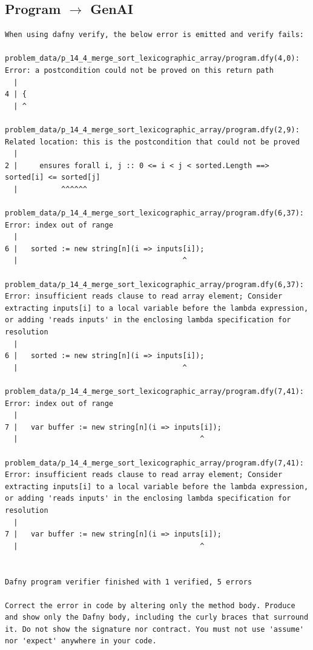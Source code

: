 \documentclass{article}
\begin{document}
\subsection*{Program $\rightarrow$ GenAI}
\begin{lstlisting}
When using dafny verify, the below error is emitted and verify fails:

problem_data/p_14_4_merge_sort_lexicographic_array/program.dfy(4,0): Error: a postcondition could not be proved on this return path
  |
4 | {
  | ^

problem_data/p_14_4_merge_sort_lexicographic_array/program.dfy(2,9): Related location: this is the postcondition that could not be proved
  |
2 | 	ensures forall i, j :: 0 <= i < j < sorted.Length ==> sorted[i] <= sorted[j]
  |          ^^^^^^

problem_data/p_14_4_merge_sort_lexicographic_array/program.dfy(6,37): Error: index out of range
  |
6 |   sorted := new string[n](i => inputs[i]);
  |                                      ^

problem_data/p_14_4_merge_sort_lexicographic_array/program.dfy(6,37): Error: insufficient reads clause to read array element; Consider extracting inputs[i] to a local variable before the lambda expression, or adding 'reads inputs' in the enclosing lambda specification for resolution
  |
6 |   sorted := new string[n](i => inputs[i]);
  |                                      ^

problem_data/p_14_4_merge_sort_lexicographic_array/program.dfy(7,41): Error: index out of range
  |
7 |   var buffer := new string[n](i => inputs[i]);
  |                                          ^

problem_data/p_14_4_merge_sort_lexicographic_array/program.dfy(7,41): Error: insufficient reads clause to read array element; Consider extracting inputs[i] to a local variable before the lambda expression, or adding 'reads inputs' in the enclosing lambda specification for resolution
  |
7 |   var buffer := new string[n](i => inputs[i]);
  |                                          ^


Dafny program verifier finished with 1 verified, 5 errors

Correct the error in code by altering only the method body. Produce and show only the Dafny body, including the curly braces that surround it. Do not show the signature nor contract. You must not use 'assume' nor 'expect' anywhere in your code.
\end{lstlisting}
\end{document}
